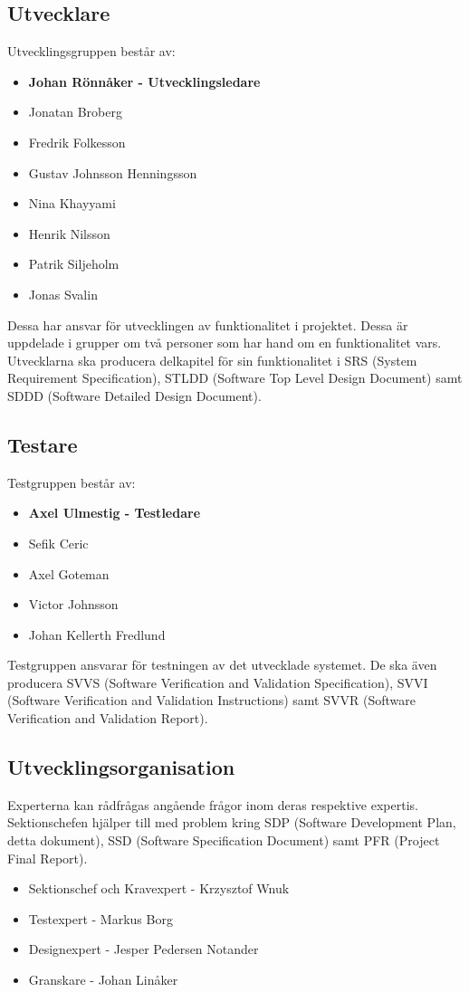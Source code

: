 \documentclass[a4paper]{article}
\begin{document}
\subsection{Utvecklare}
Utvecklingsgruppen består av:
\begin{itemize}
\item{{\bf Johan Rönnåker - Utvecklingsledare}}
\item{Jonatan Broberg}
\item{Fredrik Folkesson}
\item{Gustav Johnsson Henningsson}
\item{Nina Khayyami}
\item{Henrik Nilsson}
\item{Patrik Siljeholm}
\item{Jonas Svalin}
\end{itemize}

Dessa har ansvar för utvecklingen av funktionalitet i projektet. Dessa är uppdelade i grupper om två personer som har hand om en funktionalitet vars. Utvecklarna ska producera delkapitel för sin funktionalitet i SRS (System Requirement Specification), STLDD (Software Top Level Design Document) samt SDDD (Software Detailed Design Document).

\subsection{Testare}
Testgruppen består av:
\begin{itemize}
\item{{\bf Axel Ulmestig - Testledare}}
\item{Sefik Ceric}
\item{Axel Goteman}
\item{Victor Johnsson}
\item{Johan Kellerth Fredlund}

\end{itemize}

Testgruppen ansvarar för testningen av det utvecklade systemet. De ska även producera SVVS (Software Verification and Validation Specification), SVVI (Software Verification and Validation Instructions) samt SVVR (Software Verification and Validation Report).

\subsection{Utvecklingsorganisation}
Experterna kan rådfrågas angående frågor inom deras respektive expertis. Sektionschefen hjälper till med problem kring SDP (Software Development Plan, detta dokument), SSD (Software Specification Document) samt PFR (Project Final Report).
\begin{itemize}
\item{Sektionschef och Kravexpert - Krzysztof Wnuk}
\item{Testexpert - Markus Borg}
\item{Designexpert - Jesper Pedersen Notander}
\item{Granskare - Johan Linåker}
\end{itemize}
\end{document}
